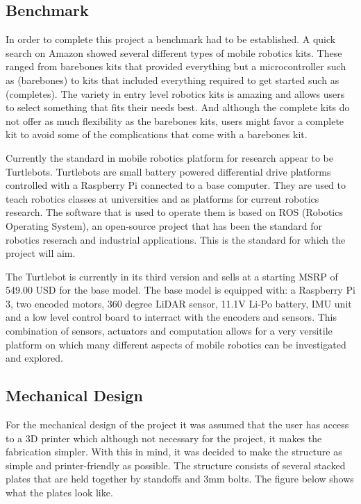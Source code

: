 \documentclass[12pt, letterpaper,titlepage]{article}
\begin{document}
\subsection{Benchmark}

	In order to complete this project a benchmark had to be established. A quick search on Amazon showed several different types of mobile robotics kits. These ranged from barebones kits that provided everything but a microcontroller such as (barebones) to kits that included everything required to get started such as (completes). The variety in entry level robotics kits is amazing and allows users to select something that fits their needs best. And although the complete kits do not offer as much flexibility as the barebones kits, users might favor a complete kit to avoid some of the complications that come with a barebones kit. 

	Currently the standard in mobile robotics platform for research appear to be Turtlebots. Turtlebots are small battery powered differential drive platforms controlled with a Raspberry Pi connected to a base computer. They are used to teach robotics classes at universities and as platforms for current robotics research. The software that is used to operate them is based on ROS (Robotics Operating System), an open-source project that has been the standard for robotics reserach and industrial applications. This is the standard for which the project will aim.

	The Turtlebot is currently in its third version and sells at a starting MSRP of 549.00 USD for the base model. The base model is equipped with: a Raspberry Pi 3, two encoded motors, 360 degree LiDAR sensor, 11.1V Li-Po battery, IMU unit and a low level control board to interract with the encoders and sensors. This combination of sensors, actuators and computation allows for a very versitile platform on which many different aspects of mobile robotics can be investigated and explored.

\subsection{Mechanical Design}

	For the mechanical design of the project it was assumed that the user has access to a 3D printer which although not necessary for the project, it makes the fabrication simpler. With this in mind, it was decided to make the structure as simple and printer-friendly as possible. The structure consists of several stacked plates that are held together by standoffs and 3mm bolts. The figure below shows what the plates look like.
\end{document}
